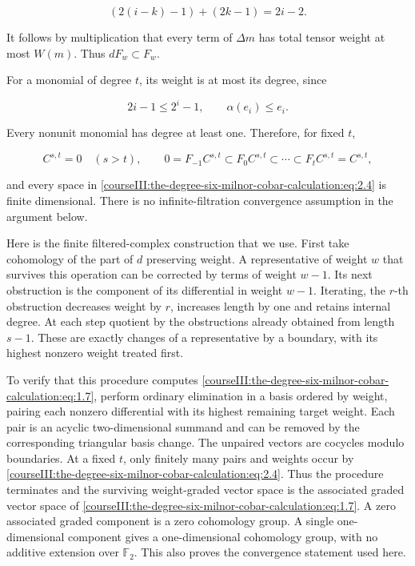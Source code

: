 \begin{equation}
(2(i-k)-1)+(2k-1)=2i-2.
 \label{courseIII:the-degree-six-milnor-cobar-calculation:eq:2.2}
\end{equation}

It follows by multiplication that every term of \(\Delta m\) has total tensor weight at most \(W(m)\). Thus \(dF_w\subset F_w\).

For a monomial of degree \(t\), its weight is at most its degree, since

\begin{equation}
2i-1\leq2^i-1,\qquad \alpha(e_i)\leq e_i.
 \label{courseIII:the-degree-six-milnor-cobar-calculation:eq:2.3}
\end{equation}

Every nonunit monomial has degree at least one. Therefore, for fixed \(t\),

\begin{equation}
C^{s,t}=0\quad(s>t),\qquad
 0=F_{-1}C^{s,t}\subset F_0C^{s,t}\subset\cdots
       \subset F_tC^{s,t}=C^{s,t},
 \label{courseIII:the-degree-six-milnor-cobar-calculation:eq:2.4}
\end{equation}

and every space in \eqref{courseIII:the-degree-six-milnor-cobar-calculation:eq:2.4} is finite dimensional. There is no infinite-filtration convergence assumption in the argument below.

Here is the finite filtered-complex construction that we use. First take cohomology of the part of \(d\) preserving weight. A representative of weight \(w\) that survives this operation can be corrected by terms of weight \(w-1\). Its next obstruction is the component of its differential in weight \(w-1\). Iterating, the \(r\)-th obstruction decreases weight by \(r\), increases length by one and retains internal degree. At each step quotient by the obstructions already obtained from length \(s-1\). These are exactly changes of a representative by a boundary, with its highest nonzero weight treated first.

To verify that this procedure computes \eqref{courseIII:the-degree-six-milnor-cobar-calculation:eq:1.7}, perform ordinary elimination in a basis ordered by weight, pairing each nonzero differential with its highest remaining target weight. Each pair is an acyclic two-dimensional summand and can be removed by the corresponding triangular basis change. The unpaired vectors are cocycles modulo boundaries. At a fixed \(t\), only finitely many pairs and weights occur by \eqref{courseIII:the-degree-six-milnor-cobar-calculation:eq:2.4}. Thus the procedure terminates and the surviving weight-graded vector space is the associated graded vector space of \eqref{courseIII:the-degree-six-milnor-cobar-calculation:eq:1.7}. A zero associated graded component is a zero cohomology group. A single one-dimensional component gives a one-dimensional cohomology group, with no additive extension over \(\mathbb F _2\). This also proves the convergence statement used here.


